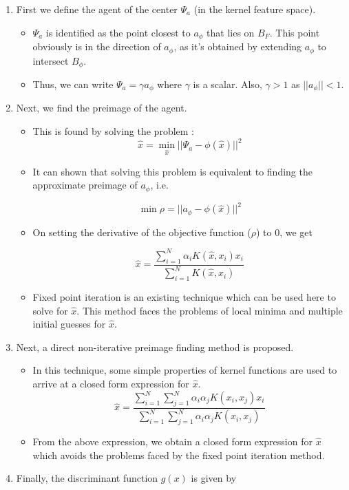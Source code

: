 \documentclass{article} %
\begin{document}
\begin{enumerate}
\item First we define the agent of the center $\Psi_a$ (in the kernel feature space).
\begin{itemize}

\item $\Psi_a$ is identified as the point closest to $a_\phi$ that lies on $B_F$. This point obviously is in the direction of $a_\phi$, as it's obtained by extending $a_\phi$ to intersect $B_{\phi}$.

\item Thus, we can write $\Psi_a = \gamma a_\phi$ where $\gamma$  is a scalar. Also, $\gamma >1$ as $||a_\phi|| < 1$.

\end{itemize}
\item Next, we find the preimage of the agent. 
\begin{itemize}

\item This is found by solving the problem :
\[ \hat{x} = \min_{\hat{x}} ||\Psi_a - \phi(\hat{x}) ||^2   \]

\item It can shown that solving this problem is equivalent to finding the approximate preimage of $a_\phi$, i.e.

\[ \min \rho = ||a_\phi - \phi(\hat{x}) ||^2 \]

\item On setting the derivative of the objective function ($\rho$) to 0, we get 

\[ \hat{x} = \frac{\sum\limits_{i=1}^N \alpha_i K(\hat{x},x_i)x_i}{\sum\limits_{i=1}^N K(\hat{x},x_i)} \]

\item Fixed point iteration is an existing technique which can be used here to solve for $\hat{x}$. This method faces the problems of local minima and multiple initial guesses for $\hat{x}$.
\end{itemize}
\item Next, a direct non-iterative preimage finding method is proposed.
\begin{itemize}
\item In this technique, some simple properties of kernel functions are used to arrive at a closed form expression for $\hat{x}$.
\[ \hat{x} = \frac{\sum\limits_{i=1}^N \sum\limits_{j=1}^N \alpha_i \alpha_j K(x_i,x_j) x_i}{\sum\limits_{i=1}^N \sum\limits_{j=1}^N \alpha_i \alpha_j K(x_i,x_j)} \]
\item From the above expression, we obtain a closed form expression for $\hat{x}$ which avoids the problems faced by the fixed point iteration method.
\end{itemize}
\item Finally, the discriminant function $g(x)$ is given by 


\end{enumerate}
\end{document}

